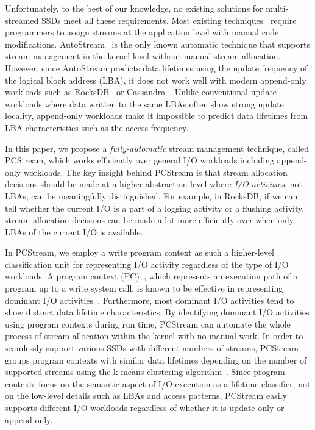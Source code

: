 Unfortunately, to the best of our knowledge, no existing solutions  for
multi-streamed SSDs meet all these requirements.  Most existing
techniques~\cite{MultiStream, Level, vStream, FStream} require programmers to
assign streams at the application level with manual code modifications.
\textsf{\small AutoStream}~\cite{AutoStream} is the only known automatic
technique that supports stream management in the kernel level without manual
stream allocation.  However, since \textsf{\small AutoStream} predicts data
lifetimes using the update frequency of the logical block address (LBA), it
does not work well with modern append-only workloads such as
RocksDB~\cite{RocksDB} or Cassandra~\cite{Cassandra}.  Unlike conventional
update workloads where data written to the same LBAs often show strong update
locality, append-only workloads make it impossible to predict data lifetimes
from LBA characteristics such as the access frequency.

In this paper, we propose a {\it fully-automatic} stream management technique,
called \textsf{\small PCStream}, which works efficiently over general I/O
workloads including append-only workloads.   The key insight behind
\textsf{\small PCStream} is that stream allocation decisions should be made at
a higher abstraction level where {\it I/O activities}, not LBAs, can be
meaningfully distinguished.  For example, in RocksDB, if we can tell whether
the current I/O is a part of a logging activity or a flushing activity, stream
allocation decisions can be made a lot more efficiently over when only LBAs of
the current I/O is available.   

In \textsf{\small PCStream}, we employ a write program context as such a higher-level
classification unit for representing I/O activity regardless of the type of I/O
workloads.  A program context (PC)~\cite{PC, PC2}, which represents an
execution path of a program up to a write system call, is known to be effective
in representing dominant I/O activities~\cite{PCHa}.  Furthermore, most
dominant I/O activities tend to show distinct data lifetime characteristics.
By identifying dominant I/O activities using program contexts during run time,
\textsf{\small PCStream} can automate the whole process of stream allocation
within the kernel with no manual work.  In order to seamlessly support various
SSDs with different numbers of streams, \textsf{\small PCStream} groups program
contexts with similar data lifetimes depending on the number of supported
streams using the k-means clustering algorithm~\cite{kmeans}.  Since program
contexts focus on the semantic aspect of I/O execution as a lifetime
classifier, not on the low-level details such as LBAs and access patterns,
\textsf{\small PCStream} easily supports different I/O workloads regardless of
whether it is update-only or append-only.   

